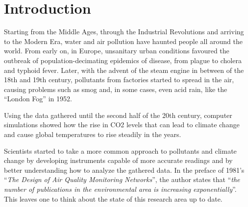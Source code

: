 

\chapter{Introduction}\label{chapter:introduction}


	
	


	Starting from the Middle Ages, through the Industrial Revolutions and arriving to the Modern Era, water and air pollution have haunted people all around the world.
	From early on, in Europe, unsanitary urban conditions favoured the outbreak of population-decimating epidemics of disease, from plague to cholera and typhoid fever.
	Later, with the advent of the steam engine in between of the 18th and 19th century, pollutants from factories started to spread in the air, causing problems such as smog and, in some cases, even acid rain, like the ``London Fog'' \cite{fog} in 1952.
	
	Using the data gathered until the second half of the 20th century, computer simulations showed how the rise in CO2 levels that can lead to climate change and cause global temperatures to rise steadily in the years.


	Scientists started to take a more common approach to pollutants and climate change by developing instruments capable of more accurate readings and by better understanding how to analyze the gathered data.
	In the preface of 1981's ``\textit{The Design of Air Quality Monitoring Networks}'', the author states that ``\textit{the number of publications in the environmental area is increasing exponentially}''\cite{airqualitynetworks}.
	This leaves one to think about the state of this research area up to date.
	
